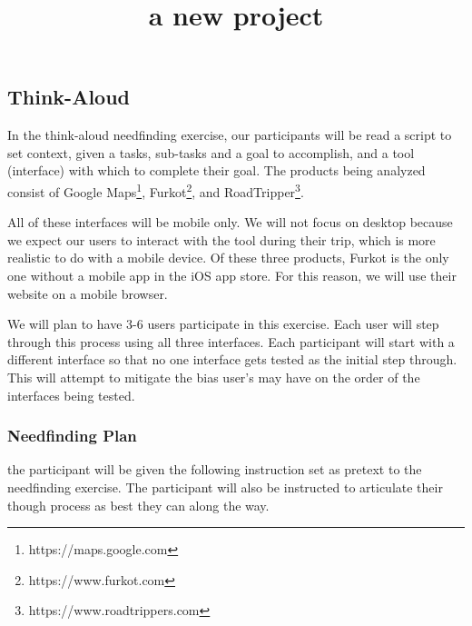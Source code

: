 

\title{a new project\\}



\maketitle
\thispagestyle{fancy}

\clearpage

\subsection{Think-Aloud}

In the think-aloud needfinding exercise, our participants will be read a script to set context, given a tasks, sub-tasks and a goal to accomplish, and a tool (interface) with which to complete their goal. The products being analyzed consist of Google Maps\footnote{https://maps.google.com}, Furkot\footnote{https://www.furkot.com}, and RoadTripper\footnote{https://www.roadtrippers.com}.

All of these interfaces will be mobile only. We will not focus on desktop because we expect our users to interact with the tool during their trip, which is more realistic to do with a mobile device. Of these three products, Furkot is the only one without a mobile app in the iOS app store. For this reason, we will use their website on a mobile browser.

We will plan to have 3-6 users participate in this exercise. Each user will step through this process using all three interfaces. Each participant will start with a different interface so that no one interface gets tested as the initial step through. This will attempt to mitigate the bias user's may have on the order of the interfaces being tested.

\subsubsection{Needfinding Plan} the participant will be given the following instruction set as pretext to the needfinding exercise. The participant will also be instructed to articulate their though process as best they can along the way.

